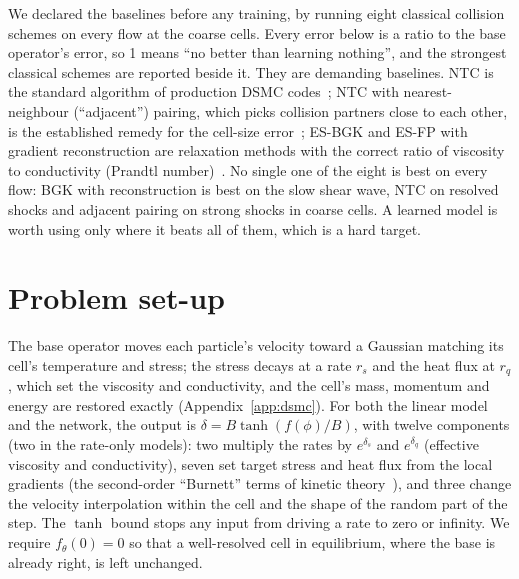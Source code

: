 \documentclass[10pt]{article}
\begin{document}
We declared the baselines before any training, by running eight classical collision schemes on
every flow at the coarse cells. Every error below is a ratio to the base operator's error, so 1
means ``no better than learning nothing'', and the strongest classical schemes are reported
beside it. They are demanding baselines. NTC is the standard algorithm of production DSMC
codes~\citep{bird1994,plimpton2019}; NTC with nearest-neighbour (``adjacent'') pairing, which
picks collision partners close to each other, is the established remedy for the cell-size
error~\citep{bird1994}; ES-BGK and ES-FP with gradient reconstruction are relaxation methods with
the correct ratio of viscosity to conductivity (Prandtl number)~\citep{holway1966,mathiaud2016}.
No single one of the eight is best on every flow: BGK with reconstruction is best on the slow
shear wave, NTC on resolved shocks and adjacent pairing on strong shocks in coarse cells. A
learned model is worth using only where it beats all of them, which is a hard target.

\section{Problem set-up}

The base operator moves each particle's velocity toward a Gaussian matching its cell's
temperature and stress; the stress decays at a rate $r_s$ and the heat flux at $r_q$, which set
the viscosity and conductivity, and the cell's mass, momentum and energy are restored exactly
(Appendix~\ref{app:dsmc}). For both the
linear model and the network, the output is $\delta=B\tanh(f(\phi)/B)$, with twelve components (two in the rate-only models): two multiply the rates by
$e^{\delta_s}$ and $e^{\delta_q}$ (effective viscosity and conductivity), seven set target
stress and heat flux from the local gradients (the second-order ``Burnett'' terms of kinetic
theory~\citep{chapman1970}), and three change the velocity interpolation within the cell and
the shape of the random part of the step. The $\tanh$ bound stops any input from driving a rate
to zero or infinity. We require $f_\theta(0)=0$ so that a well-resolved cell in equilibrium,
where the base is already right, is left unchanged.
\end{document}
